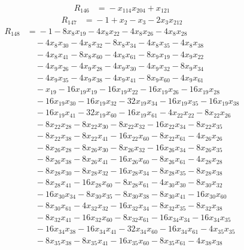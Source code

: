 \begin{align*}
R_{146}&={}-x_{114}x_{204} +x_{121}
\end{align*}
\begin{align*}
R_{147}&={}-1 +x_{2} -x_{3} -2x_{3}x_{212}
\end{align*}
\begin{align*}
R_{148}&={}-1 -8x_{8}x_{19} -4x_{8}x_{22} -4x_{8}x_{26} -4x_{8}x_{28}\\
&\quad{}-4x_{8}x_{30} -4x_{8}x_{32} -8x_{8}x_{34} -4x_{8}x_{35} -4x_{8}x_{38}\\
&\quad{}-4x_{8}x_{41} -8x_{8}x_{60} -4x_{8}x_{61} -8x_{9}x_{19} -4x_{9}x_{22}\\
&\quad{}-4x_{9}x_{26} -4x_{9}x_{28} -4x_{9}x_{30} -4x_{9}x_{32} -8x_{9}x_{34}\\
&\quad{}-4x_{9}x_{35} -4x_{9}x_{38} -4x_{9}x_{41} -8x_{9}x_{60} -4x_{9}x_{61}\\
&\quad{}-x_{19} -16x_{19}x_{19} -16x_{19}x_{22} -16x_{19}x_{26} -16x_{19}x_{28}\\
&\quad{}-16x_{19}x_{30} -16x_{19}x_{32} -32x_{19}x_{34} -16x_{19}x_{35} -16x_{19}x_{38}\\
&\quad{}-16x_{19}x_{41} -32x_{19}x_{60} -16x_{19}x_{61} -4x_{22}x_{22} -8x_{22}x_{26}\\
&\quad{}-8x_{22}x_{28} -8x_{22}x_{30} -8x_{22}x_{32} -16x_{22}x_{34} -8x_{22}x_{35}\\
&\quad{}-8x_{22}x_{38} -8x_{22}x_{41} -16x_{22}x_{60} -8x_{22}x_{61} -4x_{26}x_{26}\\
&\quad{}-8x_{26}x_{28} -8x_{26}x_{30} -8x_{26}x_{32} -16x_{26}x_{34} -8x_{26}x_{35}\\
&\quad{}-8x_{26}x_{38} -8x_{26}x_{41} -16x_{26}x_{60} -8x_{26}x_{61} -4x_{28}x_{28}\\
&\quad{}-8x_{28}x_{30} -8x_{28}x_{32} -16x_{28}x_{34} -8x_{28}x_{35} -8x_{28}x_{38}\\
&\quad{}-8x_{28}x_{41} -16x_{28}x_{60} -8x_{28}x_{61} -4x_{30}x_{30} -8x_{30}x_{32}\\
&\quad{}-16x_{30}x_{34} -8x_{30}x_{35} -8x_{30}x_{38} -8x_{30}x_{41} -16x_{30}x_{60}\\
&\quad{}-8x_{30}x_{61} -4x_{32}x_{32} -16x_{32}x_{34} -8x_{32}x_{35} -8x_{32}x_{38}\\
&\quad{}-8x_{32}x_{41} -16x_{32}x_{60} -8x_{32}x_{61} -16x_{34}x_{34} -16x_{34}x_{35}\\
&\quad{}-16x_{34}x_{38} -16x_{34}x_{41} -32x_{34}x_{60} -16x_{34}x_{61} -4x_{35}x_{35}\\
&\quad{}-8x_{35}x_{38} -8x_{35}x_{41} -16x_{35}x_{60} -8x_{35}x_{61} -4x_{38}x_{38}\\

\end{align*}
